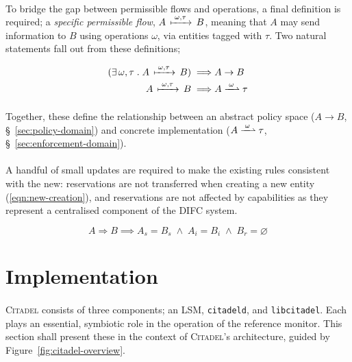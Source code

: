\paragraph{} To bridge the gap between permissible flows and operations, a final definition is required; a \textit{specific permissible flow}, $A \,\xmapsto{\;\omega,\tau\;}\, B$, meaning that $A$ may send information to $B$ using operations $\omega$, via entities tagged with $\tau$. Two natural statements fall out from these definitions;

\vspace{-7mm}
\begin{align}
    (\exists\, \omega,\tau \;.\; A \,\xmapsto{\;\omega,\tau\;}\, B) \implies & A \rightarrow B \\
    A \,\xmapsto{\;\omega,\tau\;}\, B \implies & A \xrightharpoonup{\;\omega\;} \tau \label{eqn:flow-abs-conc-map}
\end{align}

\paragraph{} Together, these define the relationship between an abstract policy space ($A \rightarrow B$, §~\ref{sec:policy-domain}) and concrete implementation ($A \xrightharpoonup{\;\omega\;} \tau$, §~\ref{sec:enforcement-domain}).

\paragraph{} A handful of small updates are required to make the existing rules consistent with the new: reservations are not transferred when creating a new entity (\ref{eqn:new-creation}), and reservations are not affected by capabilities as they represent a centralised component of the DIFC system. 

\vspace{-5mm}
\begin{equation}
    A \Rightarrow B \implies A_s = B_s \; \wedge \; A_i = B_i \; \wedge \; B_r = \varnothing \label{eqn:new-creation}
\end{equation}

\clearpage
\section{Implementation}

\paragraph{} \textsc{Citadel} consists of three components; an LSM, \texttt{citadeld}, and \texttt{libcitadel}. Each plays an essential, symbiotic role in the operation of the reference monitor. This section shall present these in the context of \textsc{Citadel}'s architecture, guided by Figure~\ref{fig:citadel-overview}.

